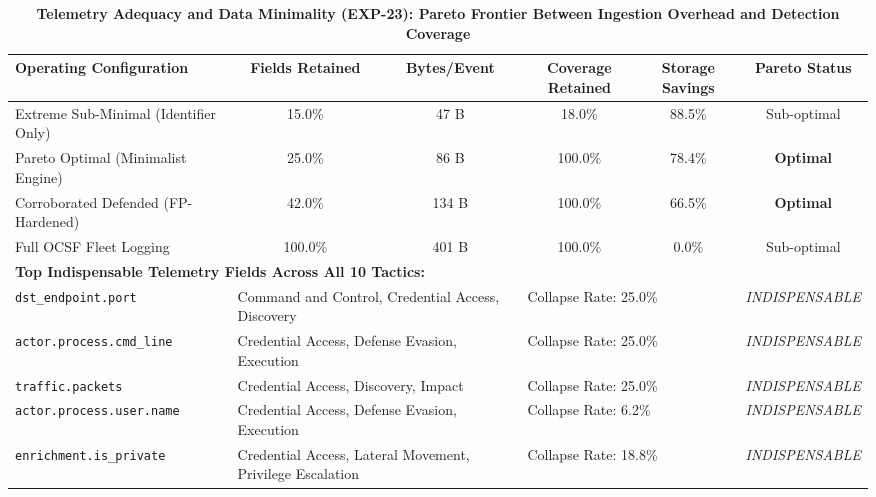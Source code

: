 \begin{table}[t]
\centering
\small
\caption{\textbf{Telemetry Adequacy and Data Minimality (EXP-23): Pareto Frontier Between Ingestion Overhead and Detection Coverage}}
\label{tab:telemetry_minimality}
\begin{tabular}{lccccc}
\toprule
\textbf{Operating Configuration} & \textbf{Fields Retained} & \textbf{Bytes/Event} & \textbf{Coverage Retained} & \textbf{Storage Savings} & \textbf{Pareto Status} \\
\midrule
Extreme Sub-Minimal (Identifier Only) & 15.0\% & 47 B & 18.0\% & 88.5\% & Sub-optimal \\
Pareto Optimal (Minimalist Engine) & 25.0\% & 86 B & 100.0\% & 78.4\% & \textbf{Optimal} \\
Corroborated Defended (FP-Hardened) & 42.0\% & 134 B & 100.0\% & 66.5\% & \textbf{Optimal} \\
Full OCSF Fleet Logging & 100.0\% & 401 B & 100.0\% & 0.0\% & Sub-optimal \\
\midrule
\multicolumn{6}{l}{\textbf{Top Indispensable Telemetry Fields Across All 10 Tactics:}} \\
\quad \texttt{dst\_endpoint.port} & \multicolumn{2}{l}{Command and Control, Credential Access, Discovery} & \multicolumn{2}{l}{Collapse Rate: 25.0\%} & \textit{INDISPENSABLE} \\
\quad \texttt{actor.process.cmd\_line} & \multicolumn{2}{l}{Credential Access, Defense Evasion, Execution} & \multicolumn{2}{l}{Collapse Rate: 25.0\%} & \textit{INDISPENSABLE} \\
\quad \texttt{traffic.packets} & \multicolumn{2}{l}{Credential Access, Discovery, Impact} & \multicolumn{2}{l}{Collapse Rate: 25.0\%} & \textit{INDISPENSABLE} \\
\quad \texttt{actor.process.user.name} & \multicolumn{2}{l}{Credential Access, Defense Evasion, Execution} & \multicolumn{2}{l}{Collapse Rate: 6.2\%} & \textit{INDISPENSABLE} \\
\quad \texttt{enrichment.is\_private} & \multicolumn{2}{l}{Credential Access, Lateral Movement, Privilege Escalation} & \multicolumn{2}{l}{Collapse Rate: 18.8\%} & \textit{INDISPENSABLE} \\
\bottomrule
\end{tabular}
\end{table}
